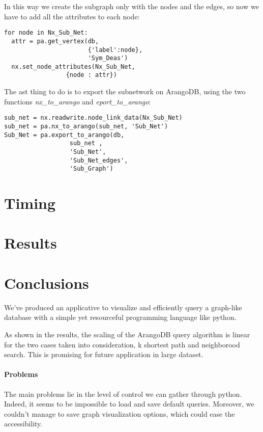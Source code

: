 \documentclass[11pt,twocolumn]{article}
\begin{document}
In this way we create the subgraph only with the nodes and the edges, so now we have to add all the attributes to each node:

\begin{verbatim}
for node in Nx_Sub_Net:
  attr = pa.get_vertex(db,
                       {'label':node},
                       'Sym_Deas')
  nx.set_node_attributes(Nx_Sub_Net,
                 {node : attr})
\end{verbatim}
The ast thing to do is to export the subnetwork on ArangoDB, using the two functions \textit{nx\_to\_arango} and \textit{eport\_to\_arango}:

\begin{verbatim}
sub_net = nx.readwrite.node_link_data(Nx_Sub_Net)
sub_net = pa.nx_to_arango(sub_net, 'Sub_Net')
Sub_Net = pa.export_to_arango(db,
                  sub_net ,
                  'Sub_Net',
                  'Sub_Net_edges',
                  'Sub_Graph')
\end{verbatim}

\section{Timing}

\section{Results}

\section{Conclusions}

We've produced an applicative to visualize and efficiently query a graph-like database with a simple yet resourceful programming language like python.

As shown in the results, the scaling of the ArangoDB query algorithm is linear for the two cases taken into consideration, k shortest path and neighborood search. This is promising for future application in large dataset.

\paragraph{Problems}

The main problems lie in the level of control we can gather through python. Indeed, it seems to be impossible to load and save default queries.
Moreover, we couldn't manage to save graph visualization options, which could ease the accessibility.
\end{document}
